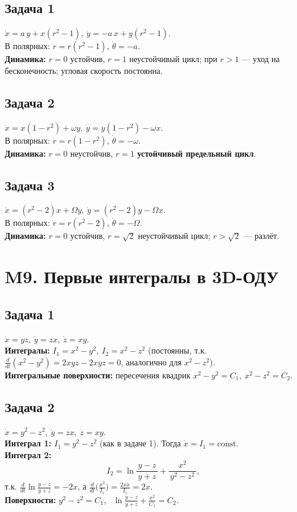 \documentclass[12pt]{article}
\begin{document}
\subsection*{Задача 1}
$\dot x=a\,y+x(r^2-1),\ \dot y=-a\,x+y(r^2-1)$. \\
В полярных: $\dot r=r(r^2-1)$, $\dot\theta=-a$. \\
\textbf{Динамика: } $r=0$ устойчив, $r=1$ неустойчивый цикл; при $r>1$ — уход на бесконечность; угловая скорость постоянна.

\subsection*{Задача 2}
$\dot x=x(1-r^2)+\omega y,\ \dot y=y(1-r^2)-\omega x$. \\
В полярных: $\dot r=r(1-r^2)$, $\dot\theta=-\omega$. \\
\textbf{Динамика: } $r=0$ неустойчив, $r=1$ \textbf{устойчивый предельный цикл}.

\subsection*{Задача 3}
$\dot x=(r^2-2)x+\Omega y,\ \dot y=(r^2-2)y-\Omega x$. \\
В полярных: $\dot r=r(r^2-2)$, $\dot\theta=-\Omega$. \\
\textbf{Динамика: } $r=0$ устойчив, $r=\sqrt2$ неустойчивый цикл; $r>\sqrt2$ — разлёт.

\section*{M9. Первые интегралы в 3D-ОДУ}

\subsection*{Задача 1}
$\dot x=yz,\ \dot y=zx,\ \dot z=xy$. \\
\textbf{Интегралы: } $I_1=x^2-y^2,\ I_2=x^2-z^2$ (постоянны, т.к. $\frac{d}{dt}(x^2-y^2)=2xyz-2xyz=0$, аналогично для $x^2-z^2$). \\
\textbf{Интегральные поверхности: } пересечения квадрик $x^2-y^2=C_1,\ x^2-z^2=C_2$.

\subsection*{Задача 2}
$\dot x=y^2-z^2,\ \dot y=zx,\ \dot z=xy$. \\
\textbf{Интеграл 1: } $I_1=y^2-z^2$ (как в задаче 1). Тогда $\dot x=I_1=\text{const}$. \\
\textbf{Интеграл 2: } 
\[
I_2=\ln\!\frac{y-z}{\,y+z\,}+\frac{x^2}{\,y^2-z^2\,},
\]
т.к. $\frac{d}{dt}\ln\frac{y-z}{y+z}=-2x$, а $\frac{d}{dt}\!\bigl(\frac{x^2}{I_1}\bigr)=\frac{2x\dot x}{I_1}=2x$. \\
\textbf{Поверхности: } $y^2-z^2=C_1$, \ $\ln\frac{y-z}{y+z}+\frac{x^2}{C_1}=C_2$.
\end{document}
